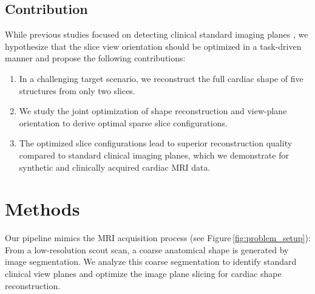     \subsection{Contribution}
    \label{sec:contribution}
    While previous studies focused on detecting clinical standard imaging planes \cite{beetz2022reconstructing,natalia2022automated,nitta2014automatic}, we hypothesize that the slice view orientation should be optimized in a task-driven manner and propose the following contributions:

    \begin{enumerate}
        \item In a challenging target scenario, we reconstruct the full cardiac shape of five structures from only two slices.
        \item We study the joint optimization of shape reconstruction and view-plane orientation to derive optimal sparse slice configurations.
        \item The optimized slice configurations lead to superior reconstruction quality compared to standard clinical imaging planes, which we demonstrate for synthetic and clinically acquired cardiac MRI data.
    \end{enumerate}

\section{Methods}
    \label{sec:method}
     Our pipeline mimics the MRI acquisition process (see Figure\,\ref{fig:problem_setup}): From a low-resolution scout scan, a coarse anatomical shape is generated by image segmentation.
    We analyze this coarse segmentation to identify standard clinical view planes and optimize the image plane slicing for cardiac shape reconstruction.
